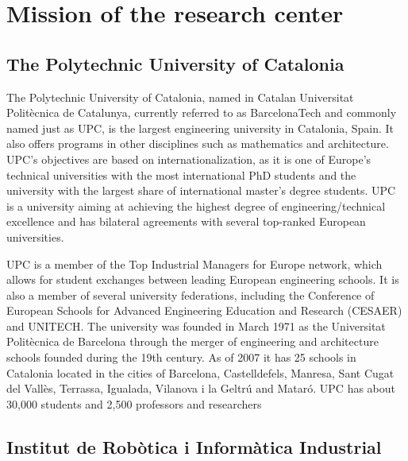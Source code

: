 
\chapter{Mission of the research center}
\label{context}

\section{The Polytechnic University of Catalonia}

The Polytechnic University of Catalonia, named in Catalan Universitat Politècnica de Catalunya, currently referred to as BarcelonaTech and commonly named just as UPC, is the largest engineering university in Catalonia, Spain.
It also offers programs in other disciplines such as mathematics and architecture.
UPC's objectives are based on internationalization, as it is one of Europe's technical universities with the most international PhD students and the university with the largest share of international master's degree students.
UPC is a university aiming at achieving the highest degree of engineering/technical excellence and has bilateral agreements with several top-ranked European universities.

UPC is a member of the Top Industrial Managers for Europe network, which allows for student exchanges between leading European engineering schools.
It is also a member of several university federations, including the Conference of European Schools for Advanced Engineering Education and Research (CESAER) and UNITECH.
The university was founded in March 1971 as the Universitat Politècnica de Barcelona through the merger of engineering and architecture schools founded during the 19th century.
As of 2007 it has 25 schools in Catalonia located in the cities of Barcelona, Castelldefels, Manresa, Sant Cugat del Vallès, Terrassa, Igualada, Vilanova i la Geltrú and Mataró.
UPC has about 30,000 students and 2,500 professors and researchers

\section{Institut de Robòtica i Informàtica Industrial}
